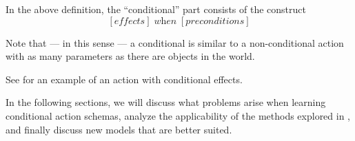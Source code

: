 \documentclass[../Master.tex]{subfiles}
\begin{document}
In the above definition, the ``conditional'' part consists of the construct 
\begin{equation*}
    \left[ \textit{effects} \right] \; \textit{when} \; \left[ \textit{preconditions} \right]
\end{equation*}

Note that --- in this sense --- a conditional is similar to a non-conditional action with as many parameters as there are objects in the world. 

See  for an example of an action with conditional effects. 

In the following sections, we will discuss what problems arise when learning conditional action schemas, analyze the applicability of the methods explored in , and finally discuss new models that are better suited.
\end{document}
